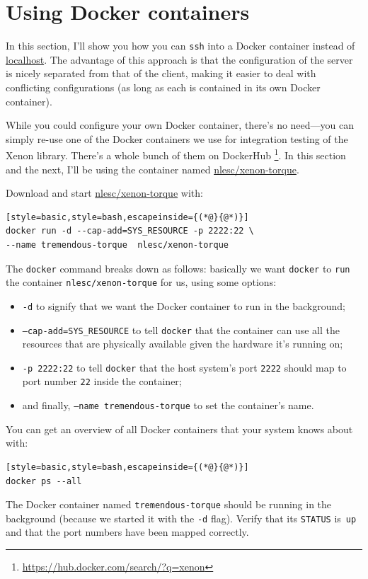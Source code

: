 \documentclass[12pt, a4paper, twoside, openany, titlepage]{book}
\begin{document}
\section{Using Docker containers}
\label{sec:docker-development}

In this section, I'll show you how you can \texttt{ssh} into a Docker
container instead of \url{localhost}. The advantage of this approach is that
the configuration of the server is nicely separated from that of the client,
making it easier to deal with conflicting configurations (as long as each is
contained in its own Docker container).

While you could configure your own Docker container, there's no need---you
can simply re-use one of the Docker containers we use for integration
testing of the Xenon library. There's a whole bunch of them on DockerHub
\footnote{\url{https://hub.docker.com/search/?q=xenon}}. In this section and
the next, I'll be using the container named \url{nlesc/xenon-torque}.

Download and start \url{nlesc/xenon-torque} with:
\begin{lstlisting}[style=basic,style=bash,escapeinside={(*@}{@*)}]
docker run -d --cap-add=SYS_RESOURCE -p 2222:22 \
--name tremendous-torque  nlesc/xenon-torque
\end{lstlisting}

The \texttt{docker} command breaks down as follows: basically we want \texttt
{docker} to \texttt{run} the container \texttt{nlesc/xenon-torque} for us,
using some options:
\begin{itemize}
\item{\texttt{-d} to signify that we want the Docker container to run in the
background;}
\item{\texttt{--cap-add=SYS\_RESOURCE} to tell \texttt{docker} that the
container can use all the resources that are physically available given the
hardware it's running on;}
\item{\texttt{-p 2222:22} to tell \texttt{docker} that the host system's
port \texttt{2222} should map to port number \texttt{22} inside the
container;}
\item{and finally, \texttt{--name tremendous-torque} to set the container's
name.}
\end{itemize}


You can get an overview of all Docker containers that your system knows
about with:
\begin{lstlisting}[style=basic,style=bash,escapeinside={(*@}{@*)}]
docker ps --all
\end{lstlisting}
The Docker container named \texttt{tremendous-torque} should be running in
the background (because we started it with the \texttt{-d} flag). Verify
that its \texttt{STATUS} is~\texttt{up} and that the port numbers have been
mapped correctly.
\end{document}
